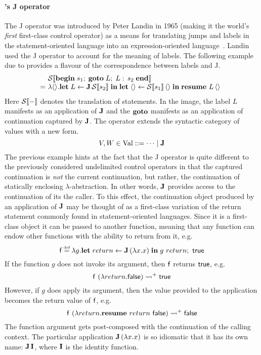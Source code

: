 \documentclass[12pt,phd,lfcs,twoside,openright,logo,leftchapter,normalheadings]{infthesis}
\theoremstyle{plain}
\theoremstyle{definition}
\begin{document}
\paragraph{\citeauthor{Landin98}'s J operator}
%
The J operator was introduced by Peter Landin in 1965 (making it the
world's \emph{first} first-class control operator) as a means for
translating jumps and labels in the statement-oriented language
\Algol{} into an expression-oriented
language~\cite{Landin65,Landin65a,Landin98}. Landin used the J
operator to account for the meaning of \Algol{} labels.
%
The following example due to \citet{DanvyM08} provides a flavour of
the correspondence between labels and J.
%
\[
  \ba{@{}l@{~}l}
    &\mathcal{S}\sembr{\keyw{begin}\;s_1;\;\keyw{goto}\;L;\;L:\,s_2\;\keyw{end}}\\
    =& \lambda\Unit.\Let\;L \revto \J\,\mathcal{S}\sembr{s_2}\;\In\;\Let\;\Unit \revto \mathcal{S}\sembr{s_1}\,\Unit\;\In\;\Continue~L\,\Unit
  \ea
\]
%
Here $\mathcal{S}\llbracket - \rrbracket$ denotes the translation of statements. In the image,
the label $L$ manifests as an application of $\mathbf{J}$ and the
$\mathbf{goto}$ manifests as an application of continuation captured by
$\mathbf{J}$.
%
The operator extends the syntactic category of values with a new
form.
%
\[
  V,W \in \textrm{Val} ::= \cdots \mid \mathbf{J}
\]
%
The previous example hints at the fact that the J operator is quite
different to the previously considered undelimited control operators
in that the captured continuation is \emph{not} the current
continuation, but rather, the continuation of statically enclosing
$\lambda$-abstraction. In other words, $\mathbf{J}$ provides access to the
continuation of its the caller.
%
To this effect, the continuation object produced by an application of
$\mathbf{J}$ may be thought of as a first-class variation of the return
statement commonly found in statement-oriented languages. Since it is
a first-class object it can be passed to another function, meaning
that any function can endow other functions with the ability to return
from it, e.g.
%
\[
  \dec{f} \defas \lambda g. \Let\;return \revto \J\,(\lambda x.x) \;\In\; g~return;~\True
\]
%
If the function $g$ does not invoke its argument, then $\mathsf{f}$
returns $\mathsf{true}$, e.g.
\[
  \mathsf{f}~(\lambda return.\mathsf{false}) \leadsto^+ \mathsf{true}
\]
%
However, if $g$ does apply its argument, then the value provided to
the application becomes the return value of $\mathsf{f}$, e.g.
%
\[
  \mathsf{f}~(\lambda return.\mathbf{resume}~return~\mathsf{false}) \leadsto^+ \mathsf{false}
\]
%
The function argument gets post-composed with the continuation of the
calling context.
%
The particular application $\mathbf{J}\,(\lambda x.x)$ is so idiomatic that it
has its own name: $\mathbf{J}\,\mathbf{I}$, where $\mathbf{I}$ is the identity function.
\end{document}
